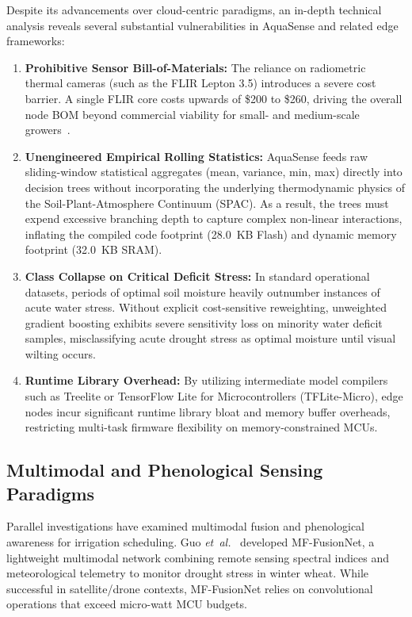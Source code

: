 Despite its advancements over cloud-centric paradigms, an in-depth technical analysis reveals several substantial vulnerabilities in AquaSense and related edge frameworks:
\begin{enumerate}
    \item \textbf{Prohibitive Sensor Bill-of-Materials:} The reliance on radiometric thermal cameras (such as the FLIR Lepton 3.5) introduces a severe cost barrier. A single FLIR core costs upwards of \$200 to \$260, driving the overall node BOM beyond commercial viability for small- and medium-scale growers~\cite{nugroho2025lowcost, yang2026watermelon}.
    \item \textbf{Unengineered Empirical Rolling Statistics:} AquaSense feeds raw sliding-window statistical aggregates (mean, variance, min, max) directly into decision trees without incorporating the underlying thermodynamic physics of the Soil-Plant-Atmosphere Continuum (SPAC). As a result, the trees must expend excessive branching depth to capture complex non-linear interactions, inflating the compiled code footprint (28.0~KB Flash) and dynamic memory footprint (32.0~KB SRAM).
    \item \textbf{Class Collapse on Critical Deficit Stress:} In standard operational datasets, periods of optimal soil moisture heavily outnumber instances of acute water stress. Without explicit cost-sensitive reweighting, unweighted gradient boosting exhibits severe sensitivity loss on minority water deficit samples, misclassifying acute drought stress as optimal moisture until visual wilting occurs.
    \item \textbf{Runtime Library Overhead:} By utilizing intermediate model compilers such as Treelite or TensorFlow Lite for Microcontrollers (TFLite-Micro), edge nodes incur significant runtime library bloat and memory buffer overheads, restricting multi-task firmware flexibility on memory-constrained MCUs.
\end{enumerate}

\subsection{Multimodal and Phenological Sensing Paradigms}

Parallel investigations have examined multimodal fusion and phenological awareness for irrigation scheduling. Guo \textit{et~al.}~\cite{guo2025mffusionnet} developed MF-FusionNet, a lightweight multimodal network combining remote sensing spectral indices and meteorological telemetry to monitor drought stress in winter wheat. While successful in satellite/drone contexts, MF-FusionNet relies on convolutional operations that exceed micro-watt MCU budgets. 

